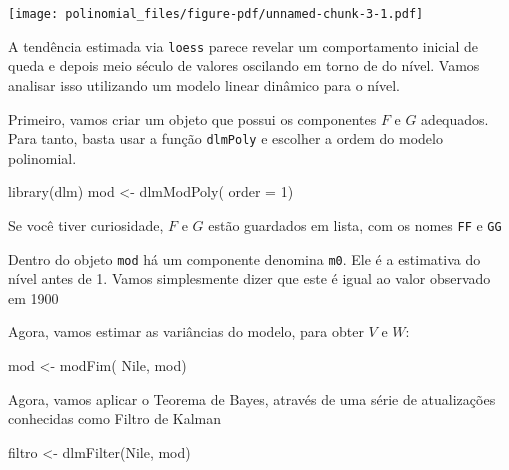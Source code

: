 \documentclass[
  letterpaper,
  DIV=11,
  numbers=noendperiod]{scrreprt}
\newenvironment{Shaded}{\begin{snugshade}}{\end{snugshade}}
\newcommand{\AttributeTok}[1]{\textcolor[rgb]{0.40,0.45,0.13}{#1}}
\newcommand{\DecValTok}[1]{\textcolor[rgb]{0.68,0.00,0.00}{#1}}
\newcommand{\FunctionTok}[1]{\textcolor[rgb]{0.28,0.35,0.67}{#1}}
\newcommand{\NormalTok}[1]{\textcolor[rgb]{0.00,0.23,0.31}{#1}}
\newcommand{\OtherTok}[1]{\textcolor[rgb]{0.00,0.23,0.31}{#1}}
\newcommand{\SpecialCharTok}[1]{\textcolor[rgb]{0.37,0.37,0.37}{#1}}
\begin{document}
\texttt{[image: polinomial\_files/figure-pdf/unnamed-chunk-3-1.pdf]}

A tendência estimada via \texttt{loess} parece revelar um comportamento
inicial de queda e depois meio século de valores oscilando em torno de
do nível. Vamos analisar isso utilizando um modelo linear dinâmico para
o nível.

Primeiro, vamos criar um objeto que possui os componentes \(F\) e \(G\)
adequados. Para tanto, basta usar a função \texttt{dlmPoly} e escolher a
ordem do modelo polinomial.

\begin{Shaded}
\begin{Highlighting}[]
\FunctionTok{library}\NormalTok{(dlm)}
\NormalTok{mod }\OtherTok{\textless{}{-}} \FunctionTok{dlmModPoly}\NormalTok{( }\AttributeTok{order =} \DecValTok{1}\NormalTok{)}
\end{Highlighting}
\end{Shaded}

Se você tiver curiosidade, \(F\) e \(G\) estão guardados em lista, com
os nomes \texttt{FF} e \texttt{GG}

Dentro do objeto \texttt{mod} há um componente denomina \texttt{m0}. Ele
é a estimativa do nível antes de 1. Vamos simplesmente dizer que este é
igual ao valor observado em 1900

\begin{Shaded}
\end{Shaded}

Agora, vamos estimar as variâncias do modelo, para obter \(V\) e \(W\):

\begin{Shaded}
\begin{Highlighting}[]
\NormalTok{mod }\OtherTok{\textless{}{-}} \FunctionTok{modFim}\NormalTok{( Nile, mod)}
\end{Highlighting}
\end{Shaded}

Agora, vamos aplicar o Teorema de Bayes, através de uma série de
atualizações conhecidas como Filtro de Kalman

\begin{Shaded}
\begin{Highlighting}[]
\NormalTok{filtro }\OtherTok{\textless{}{-}} \FunctionTok{dlmFilter}\NormalTok{(Nile, mod)}
\end{Highlighting}
\end{Shaded}
\end{document}
